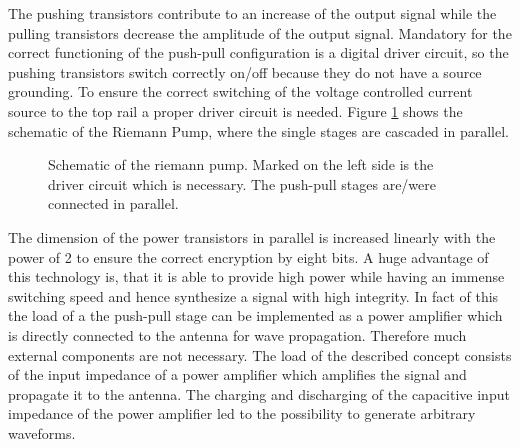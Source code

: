 \documentclass[journal]{IEEEtran}
\begin{document}
The pushing transistors contribute to an increase of the output signal while the pulling transistors decrease the amplitude of the output signal.
Mandatory for the correct functioning of the push-pull configuration is a digital driver circuit, so the pushing transistors switch correctly on/off because they do not have a source grounding.
To ensure the correct switching of the voltage controlled current source to the top rail a proper driver circuit is needed. 
Figure \ref{fig:schematic_multibit_rp} shows the schematic of the Riemann Pump, where the single stages are cascaded in parallel.
%
\begin{figure}[htb]
  \centering
	\begin{scriptsize}
  	\def\svgwidth{\columnwidth}
 	 
  	\caption{Schematic of the riemann pump. Marked on the left side is the driver circuit which is necessary. The push-pull stages are/were connected in parallel.}
  	\label{fig:schematic_multibit_rp}
	\end{scriptsize}
\end{figure}
The dimension of the power transistors in parallel is increased linearly with the power of 2 to ensure the correct encryption by eight bits.
A huge advantage of this technology is, that it is able to provide high power while having an immense switching speed and hence synthesize a signal with high integrity.
In fact of this the load of a the push-pull stage can be implemented as a power amplifier which is directly connected to the antenna for wave propagation.
Therefore much external components are not necessary.
The load of the described concept consists of the input impedance of a power amplifier which amplifies the signal and propagate it to the antenna.
The charging and discharging of the capacitive input impedance of the power amplifier led to the possibility to generate arbitrary waveforms.
\end{document}
